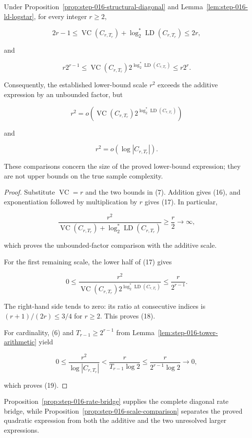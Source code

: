 \begin{proposition}\label{prop:step-016-scale-comparison}
Under Proposition~\ref{prop:step-016-structural-diagonal} and
Lemma~\ref{lem:step-016-ld-logstar}, for every integer \(r\ge2\),

\[
2r-1
\le
\operatorname{VC}(C_{r,T_r})
+\log_2^*\operatorname{LD}(C_{r,T_r})
\le2r,
\tag{16}
\]

and

\[
r2^{r-1}
\le
\operatorname{VC}(C_{r,T_r})
2^{\log_2^*\operatorname{LD}(C_{r,T_r})}
\le r2^r.
\tag{17}
\]

Consequently, the established lower-bound scale \(r^2\) exceeds the
additive expression by an unbounded factor, but

\[
r^2
=o\!\left(
\operatorname{VC}(C_{r,T_r})
2^{\log_2^*\operatorname{LD}(C_{r,T_r})}
\right)
\tag{18}
\]

and

\[
r^2=o(\log|C_{r,T_r}|).
\tag{19}
\]

These comparisons concern the size of the proved lower-bound expression;
they are not upper bounds on the true sample complexity.
\end{proposition}

\begin{proof}
Substitute \(\operatorname{VC}=r\) and the two bounds in (7). Addition
gives (16), and exponentiation followed by multiplication by \(r\) gives
(17). In particular,

\[
\frac{r^2}{
 \operatorname{VC}(C_{r,T_r})
 +\log_2^*\operatorname{LD}(C_{r,T_r})}
\ge\frac r2\longrightarrow\infty,
\]

which proves the unbounded-factor comparison with the additive scale.

For the first remaining scale, the lower half of (17) gives

\[
0\le
\frac{r^2}{
 \operatorname{VC}(C_{r,T_r})
 2^{\log_2^*\operatorname{LD}(C_{r,T_r})}}
\le\frac r{2^{r-1}}.
\tag{20}
\]

The right-hand side tends to zero: its ratio at consecutive indices is
\((r+1)/(2r)\le3/4\) for \(r\ge2\). This proves (18).

For cardinality, (6) and \(T_{r-1}\ge2^{r-1}\) from
Lemma~\ref{lem:step-016-tower-arithmetic} yield

\[
0\le\frac{r^2}{\log|C_{r,T_r}|}
<\frac{r}{T_{r-1}\log2}
\le\frac{r}{2^{r-1}\log2}\longrightarrow0,
\]

which proves (19). \end{proof}
Proposition~\ref{prop:step-016-rate-bridge} supplies the complete diagonal
rate bridge, while Proposition~\ref{prop:step-016-scale-comparison}
separates the proved quadratic expression from both the additive and the
two unresolved larger expressions.

